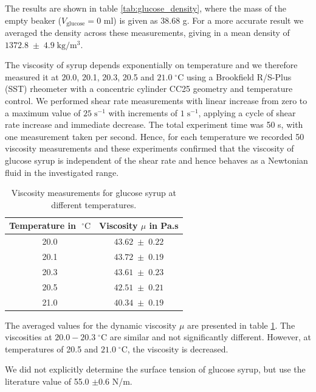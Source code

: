 \documentclass[aip,graphicx]{revtex4-1}
\newcommand{\sym}[1]{\text{#1}}
\newcommand{\degC}[1]{#1 \; ^{\circ} \text{C}}
\begin{document}
The results are shown in table \ref{tab:glucose_density}, where the mass of the empty beaker ($V_{\sym{glucose}}=0$ ml) is given as 38.68 g. 
For a more accurate result we averaged the density across these measurements, giving in a mean density of $1372.8 \; \pm \; 4.9 \; \sym{kg}/\sym{m}^3$.

The viscosity of syrup depends exponentially on temperature \cite{llewellin2002rheology} and we therefore measured it at 20.0, 20.1, 20.3, 20.5 and $\degC{21.0}$ using a Brookfield R/S-Plus (SST) rheometer with a concentric cylinder CC25 geometry and temperature control. 
We performed shear rate measurements with linear increase from zero to a maximum value of $25 \; \sym{s}^{-1}$ with increments of $1 \; \sym{s}^{-1}$, applying a cycle of shear rate increase and immediate decrease. 
The total experiment time was 50 s, with one measurement taken per second.
Hence, for each temperature we recorded 50 viscosity measurements and these experiments confirmed that the viscosity of glucose syrup is independent of the shear rate and hence behaves as a Newtonian fluid in the investigated range.

{\renewcommand{\arraystretch}{1.2}
 \begin{table}[!ht]
 \begin{center}
 \begin{tabular}{c | c}
  Temperature in $\degC{}$ & Viscosity $\mu$ in Pa.s \\ 
   \hline
   20.0 & $43.62 \; \pm \; 0.22$ \\
   20.1 & $43.72 \; \pm \; 0.19$ \\
   20.3 & $43.61 \; \pm \; 0.23$ \\
   20.5 & $42.51 \; \pm \; 0.21$ \\
   21.0 & $40.34 \; \pm \; 0.19$\\
 \end{tabular}
 \caption{Viscosity measurements for glucose syrup at different temperatures.}
 \label{tab:glucose_viscosity}
 \end{center}
 \end{table}}
 
The averaged values for the dynamic viscosity $\mu$ are presented in table \ref{tab:glucose_viscosity}. 
The viscosities at $20.0 - \degC{20.3}$ are similar and not significantly different. 
However, at temperatures of 20.5 and $\degC{21.0}$, the viscosity is decreased.

We did not explicitly determine the surface tension of glucose syrup, but use the literature \cite{montanez2013influence} value of 55.0 $\pm 0.6$ N/m.
\end{document}
